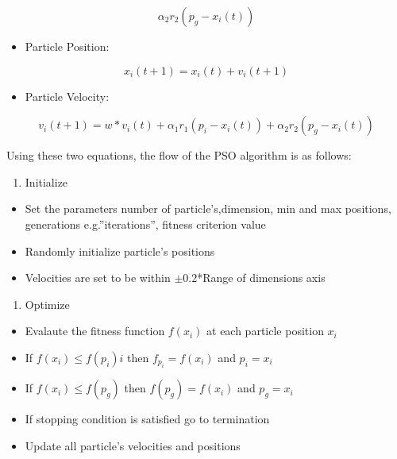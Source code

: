 \documentclass[
]{article}
\providecommand{\tightlist}{%
  \setlength{\itemsep}{0pt}\setlength{\parskip}{0pt}}
\begin{document}
\[
\alpha_2  r_2(p_g-x_i(t))
\]

\begin{itemize}
\tightlist
\item
  Particle Position:
\end{itemize}

\[
x_i(t+1) = x_i(t) + v_i(t+1)
\]

\begin{itemize}
\tightlist
\item
  Particle Velocity:
\end{itemize}

\[
v_i(t+1)=w * v_i(t) +\alpha_1  r_1(p_i-x_i(t))+\alpha_2r_2(p_g-x_i(t))
\]

Using these two equations, the flow of the PSO algorithm is as follows:

\begin{enumerate}
\def\labelenumi{\Roman{enumi})}
\tightlist
\item
  Initialize
\end{enumerate}

\begin{itemize}
\tightlist
\item
  Set the parameters number of particle's,dimension, min and max
  positions, generations e.g.''iterations'', fitness criterion value
\item
  Randomly initialize particle's positions
\item
  Velocities are set to be within \(\pm0.2\)*Range of dimensions axis
\end{itemize}

\begin{enumerate}
\def\labelenumi{\Roman{enumi})}
\setcounter{enumi}{1}
\tightlist
\item
  Optimize
\end{enumerate}

\begin{itemize}
\item
  Evalaute the fitness function \(f(x_i)\) at each particle position
  \(x_i\)
\item
  If \(f(x_i) \le f(p_i)i\) then \(f_{p_i}=f(x_i)\) and \(p_i=x_i\)
\item
  If \(f(x_i) \le f(p_g)\) then \(f(p_g)=f(x_i)\) and \(p_g=x_i\)
\item
  If stopping condition is satisfied go to termination
\item
  Update all particle's velocities and positions
\end{itemize}
\end{document}
